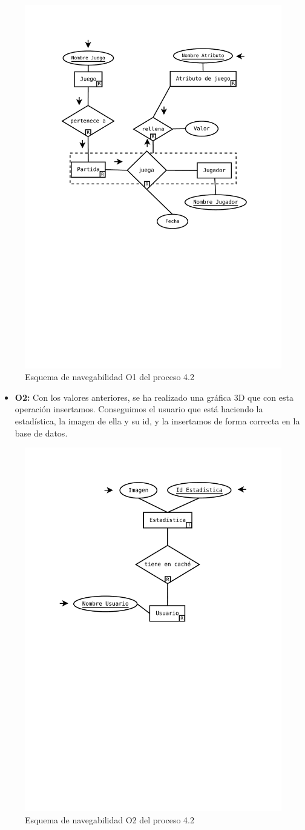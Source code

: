 \begin{figure}[H]
	\centering
	\includegraphics[width=0.5\linewidth]{../Diagramas/pdf/OpEstadisticas3.pdf}
	\caption{Esquema de navegabilidad  O1 del proceso 4.2}
	
	\label{fig:O4.2}
\end{figure}
\begin{itemize}
	\item \textbf{O2:} Con los valores anteriores, se ha realizado una gráfica 3D que con esta operación insertamos. Conseguimos el usuario que está haciendo la estadística, la imagen de ella y su id, y la insertamos de forma correcta en la base de datos.
\end{itemize}

\begin{figure}[H]
	\centering
	\includegraphics[width=0.5\linewidth]{../Diagramas/pdf/OpEstadisticas1-2.pdf}
	\caption{Esquema de navegabilidad  O2 del proceso 4.2}
	
	\label{fig:O4.22}
\end{figure}

